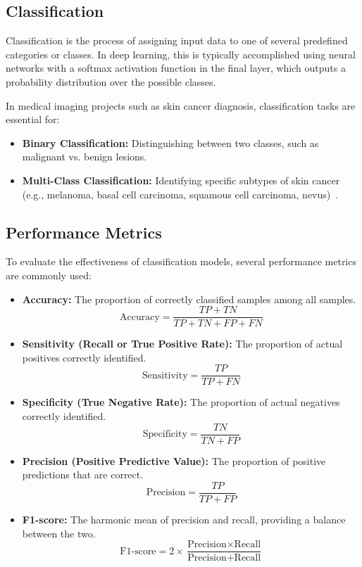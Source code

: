 \documentclass[a4paper,12pt]{report}
\begin{document}
\begin{spacing}{1.5}
    \section{Classification}
    Classification is the process of assigning input data to one of several predefined categories or classes. In deep learning, this is typically accomplished using neural networks with a softmax activation function in the final layer, which outputs a probability distribution over the possible classes.

    In medical imaging projects such as skin cancer diagnosis, classification tasks are essential for:
    \begin{itemize}
        \item \textbf{Binary Classification:} Distinguishing between two classes, such as malignant vs. benign lesions.
        \item \textbf{Multi-Class Classification:} Identifying specific subtypes of skin cancer (e.g., melanoma, basal cell carcinoma, squamous cell carcinoma, nevus)~\cite{dl6}.
    \end{itemize}

    \subsection*{Performance Metrics}
    To evaluate the effectiveness of classification models, several performance metrics are commonly used:

    \begin{itemize}
        \item \textbf{Accuracy:} The proportion of correctly classified samples among all samples.
        \[
            \text{Accuracy} = \frac{TP + TN}{TP + TN + FP + FN}
        \]
        \item \textbf{Sensitivity (Recall or True Positive Rate):} The proportion of actual positives correctly identified.
        \[
            \text{Sensitivity} = \frac{TP}{TP + FN}
        \]
        \item \textbf{Specificity (True Negative Rate):} The proportion of actual negatives correctly identified.
        \[
            \text{Specificity} = \frac{TN}{TN + FP}
        \]
        \item \textbf{Precision (Positive Predictive Value):} The proportion of positive predictions that are correct.
        \[
            \text{Precision} = \frac{TP}{TP + FP}
        \]
        \item \textbf{F1-score:} The harmonic mean of precision and recall, providing a balance between the two.
        \[
            \text{F1-score} = 2 \times \frac{\text{Precision} \times \text{Recall}}{\text{Precision} + \text{Recall}}
        \]
    \end{itemize}


\end{spacing}
\end{document}
